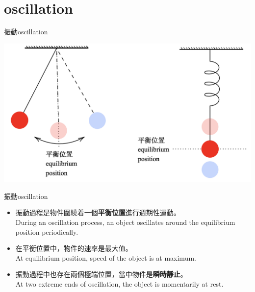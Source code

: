 \documentclass[beamer=true]{standalone}
\begin{document}

\section{oscillation}
\begin{frame}{振動oscillation}
    \par{\par\centering\includegraphics[width=\textwidth]{./img/ch1_2024-05-03-16-54-14.png}\par}
\end{frame}

\begin{frame}{振動oscillation}
    \begin{itemize}
        \item 振動過程是物件圍繞着一個\textbf{平衡位置}進行週期性運動。\\During an oscillation process, an object oscillates around the equilibrium position periodically.
        \item 在平衡位置中，物件的速率是最大值。\\ At equilibrium position, speed of the object is at maximum.
        \item 振動過程中也存在兩個極端位置，當中物件是\textbf{瞬時靜止}。\\At two extreme ends of oscillation, the object is momentarily at rest.
    \end{itemize}
\end{frame}
\end{document}
